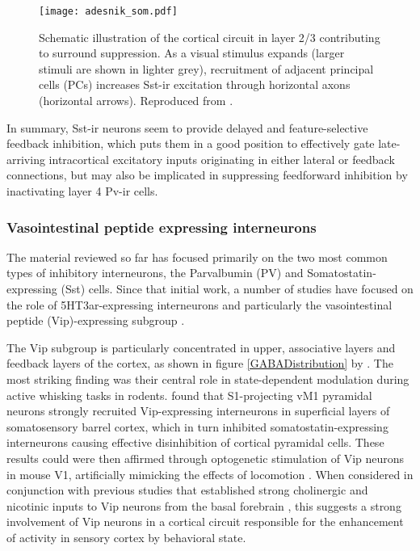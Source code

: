 \begin{figure}
	\centering
        \texttt{[image: adesnik\_som.pdf]}
	\caption[Schematic proposing Sst neurons' role in integrating
      long-range inputs. Reproduced from
      \cite{Adesnik2012}.]{Schematic illustration of the cortical
      circuit in layer 2/3 contributing to surround suppression. As a
      visual stimulus expands (larger stimuli are shown in lighter
      grey), recruitment of adjacent principal cells (PCs) increases
      Sst-ir excitation through horizontal axons (horizontal
      arrows). Reproduced from \cite{Adesnik2012}.}
	\label{som}
\end{figure}

In summary, Sst-ir neurons seem to provide delayed and
feature-selective feedback inhibition, which puts them in a good
position to effectively gate late-arriving intracortical excitatory
inputs originating in either lateral or feedback connections, but may
also be implicated in suppressing feedforward inhibition by
inactivating layer 4 Pv-ir cells.

\subsubsection{Vasointestinal peptide expressing interneurons}

The material reviewed so far has focused primarily on the two most
common types of inhibitory interneurons, the Parvalbumin (PV) and
Somatostatin-expressing (Sst) cells.  Since that initial work, a
number of studies have focused on the role of 5HT3ar-expressing
interneurons and particularly the vasointestinal peptide
(Vip)-expressing subgroup \citep{Fu2014, Higley2014, Kepecs2014,
  Lee2013}.

The Vip subgroup is particularly concentrated in upper, associative
layers and feedback layers of the cortex, as shown in figure
\ref{GABADistribution} by \cite{Rudy2011}. The most striking finding
was their central role in state-dependent modulation during active
whisking tasks in rodents. \cite{Lee2013} found that S1-projecting vM1 pyramidal
neurons strongly recruited Vip-expressing interneurons in superficial
layers of somatosensory barrel cortex, which in turn inhibited
somatostatin-expressing interneurons causing effective disinhibition
of cortical pyramidal cells. These results could were then affirmed
through optogenetic stimulation of Vip neurons in mouse V1,
artificially mimicking the effects of locomotion \citep{Fu2014}. When
considered in conjunction with previous studies that established
strong cholinergic and nicotinic inputs to Vip neurons from the basal
forebrain \citep{Wickersham2009}, this suggests a strong involvement
of Vip neurons in a cortical circuit responsible for the enhancement
of activity in sensory cortex by behavioral state.


